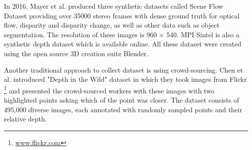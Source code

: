 In 2016, Mayer et al. \cite{MIFDB16} produced three synthetic datasets called Scene Flow Dataset providing over 35000 stereo frames with dense ground truth for optical flow, disparity and disparity change, as well as other data such as object segmentation. The resolution of these images is 960 $\times$ 540. MPI Sintel \cite{Butler:ECCV:2012} is also a synthetic depth dataset which is available online. All these dataset were created using the open source 3D creation suite Blender.

Another traditional approach to collect dataset is using crowd-sourcing. Chen et al. \cite{DBLP:journals/corr/ChenFYD16} introduced "Depth in the Wild" dataset in which they took images from Flickr \footnote{ \url{www.flickr.com}}  and presented the crowd-sourced workers with these images with two highlighted points asking which of the point was closer. The dataset consists of 495,000 diverse images, each annotated with randomly sampled points and their relative depth. 

